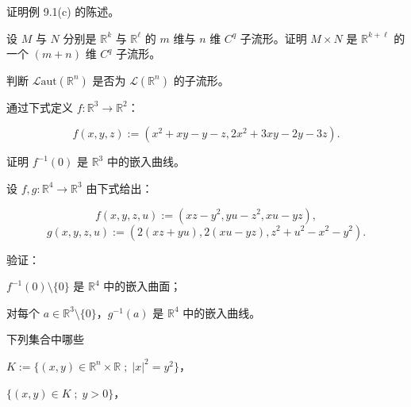 \begin{exercises}
\item

证明例 9.1(c) 的陈述。

\item

设 $ M $ 与 $ N $ 分别是 $ \mathbb{R}^{k} $ 与 $ \mathbb{R}^{\ell} $ 的 $ m $ 维与 $ n $ 维 $ C^{q} $ 子流形。证明 $ M \times N $ 是 $ \mathbb{R}^{k+\ell} $ 的一个 $ (m + n) $ 维 $ C^{q} $ 子流形。

\item

判断 $ \mathcal{L}\mathrm{aut}(\mathbb{R}^{n}) $ 是否为 $ \mathcal{L}(\mathbb{R}^{n}) $ 的子流形。

\item

通过下式定义 $ f : \mathbb{R}^{3} \to \mathbb{R}^{2} $：

\[
f(x, y, z) := (x^{2} + xy - y - z, 2x^{2} + 3xy - 2y - 3z) .
\]

证明 $ f^{-1}(0) $ 是 $ \mathbb{R}^{3} $ 中的嵌入曲线。

\item

设 $ f, g : \mathbb{R}^{4} \to \mathbb{R}^{3} $ 由下式给出：

\[
f(x, y, z, u) := (xz - y^{2}, yu - z^{2}, xu - yz) ,
\]
\[
g(x, y, z, u) := (2(xz + yu), 2(xu - yz), z^{2} + u^{2} - x^{2} - y^{2}) .
\]

验证：

\begin{items}
\item

$ f^{-1}(0)\setminus\{0\} $ 是 $ \mathbb{R}^{4} $ 中的嵌入曲面；

\item

对每个 $ a \in \mathbb{R}^{3}\setminus\{0\} $，$ g^{-1}(a) $ 是 $ \mathbb{R}^{4} $ 中的嵌入曲线。

\end{items}

\item

下列集合中哪些

\begin{items}
\item

$ K := \{ (x, y) \in \mathbb{R}^{n} \times \mathbb{R} \;;\; \left|x\right|^{2} = y^{2} \} $，

\item

$ \{ (x, y) \in K \;;\; y > 0 \} $，


\end{items}
\end{exercises}
